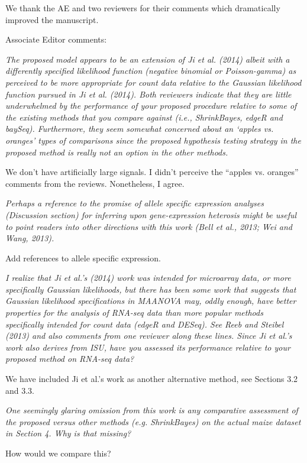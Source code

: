 \documentclass{article}
\newcommand{\comment}[1]{\textit{#1}}
\newcommand{\response}[1]{#1}
\newcommand{\todo}[1]{{\color{red} #1}}
\begin{document}
\response{We thank the AE and two reviewers for their comments which dramatically improved the manuscript.}

Associate Editor comments:

\comment{The proposed model appears to be an extension of Ji et al. (2014) albeit with a differently specified likelihood function (negative binomial or Poisson-gamma) as perceived to be more appropriate for count data relative to the Gaussian likelihood function pursued in Ji et al. (2014). Both reviewers indicate that they are little underwhelmed by the performance of your proposed procedure relative to some of the existing methods that you compare against (i.e., ShrinkBayes, edgeR and baySeq).  Furthermore, they seem somewhat concerned about an ‘apples vs. oranges’ types of comparisons since the proposed hypothesis testing strategy in the proposed method is really not an option in the other methods.}

\todo{We don't have artificially large signals. I didn't perceive the ``apples vs. oranges'' comments from the reviews. Nonetheless, I agree.}

\comment{Perhaps a reference to the promise of allele specific expression analyses (Discussion section) for inferring upon gene-expression heterosis might be useful to point readers into other directions with this work (Bell et al., 2013; Wei and Wang, 2013).}

\todo{Add references to allele specific expression.}

\comment{I realize that Ji et al.’s (2014) work was intended for microarray data, or more specifically Gaussian likelihoods, but there has been some work that suggests that Gaussian likelihood specifications in MAANOVA may, oddly enough, have better properties for the analysis of RNA-seq data than more popular methods specifically intended for count data (edgeR and DESeq).  See Reeb and Steibel (2013) and also comments from one reviewer along these lines.  Since Ji et al.’s work also derives from ISU, have you assessed its performance relative to your proposed method on RNA-seq data?}

\response{We have included Ji et al.'s work as another alternative method, see Sections 3.2 and 3.3.} 

\comment{One seemingly glaring omission from this work is any comparative assessment of the proposed versus other methods (e.g. ShrinkBayes) on the actual maize dataset in Section 4.  Why is that missing?}

\todo{How would we compare this?}
\end{document}
